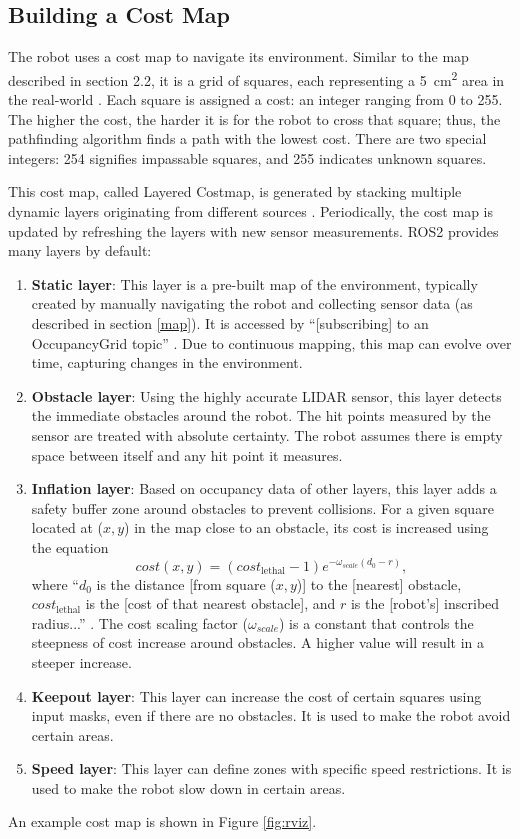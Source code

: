 \subsection{Building a Cost Map} \label{cost-map}
The robot uses a cost map to navigate its environment. Similar to the map described in section 2.2, it is a grid of squares, each representing a \qty{5}{cm^2} area in the real-world \parencite{macenskiDesksROSMaintainers2023}. Each square is assigned a cost: an integer ranging from 0 to 255. The higher the cost, the harder it is for the robot to cross that square; thus, the pathfinding algorithm finds a path with the lowest cost. There are two special integers: 254 signifies impassable squares, and 255 indicates unknown squares.

This cost map, called Layered Costmap, is generated by stacking multiple dynamic layers originating from different sources \parencite{macenskiDesksROSMaintainers2023}. Periodically, the cost map is updated by refreshing the layers with new sensor measurements. ROS2 provides many layers by default:
\begin{enumerate}
    \item \textbf{Static layer}: This layer is a pre-built map of the environment, typically created by manually navigating the robot and collecting sensor data (as described in section \ref{map}). It is accessed by ``[subscribing] to an OccupancyGrid topic'' \parencite{macenskiDesksROSMaintainers2023}. Due to continuous mapping, this map can evolve over time, capturing changes in the environment.
    \item \textbf{Obstacle layer}: Using the highly accurate LIDAR sensor, this layer detects the immediate obstacles around the robot. The hit points measured by the sensor are treated with absolute certainty. The robot assumes there is empty space between itself and any hit point it measures.
    \item \textbf{Inflation layer}: Based on occupancy data of other layers, this layer adds a safety buffer zone around obstacles to prevent collisions. For a given square located at ($x,y$) in the map close to an obstacle, its cost is increased using the equation
          \[
              cost(x,y)=(cost_\text{lethal}-1)e^{-\omega_{scale}(d_0-r)},
          \]
          where ``$d_0$ is the distance [from square ($x,y$)] to the [nearest] obstacle, $cost_\text{lethal}$ is the [cost of that nearest obstacle], and $r$ is the [robot's] inscribed radius...'' \parencite{macenskiDesksROSMaintainers2023}. The cost scaling factor ($\omega_{scale}$) is a constant that controls the steepness of cost increase around obstacles. A higher value will result in a steeper increase.
    \item \textbf{Keepout layer}: This layer can increase the cost of certain squares using input masks, even if there are no obstacles. It is used to make the robot avoid certain areas.
    \item \textbf{Speed layer}: This layer can define zones with specific speed restrictions. It is used to make the robot slow down in certain areas.
\end{enumerate}
An example cost map is shown in Figure \ref{fig:rviz}.


